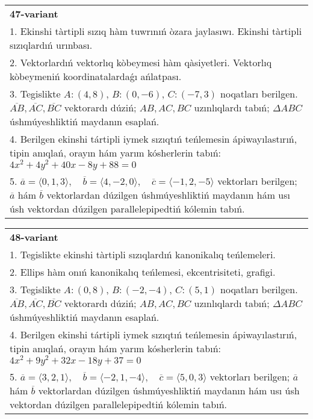 \documentclass{article}
\begin{document}
\begin{tabular}{m{17cm}}
\textbf{47-variant}\\
1. Ekinshi tàrtipli sızıq hàm tuwrınıń òzara jaylasıwı. Ekinshi tàrtipli sızıqlardıń urınbası.\\

2. Vektorlardıń vektorlıq kòbeymesi hàm qàsiyetleri. Vektorlıq kòbeymeniń koordinatalardaǵı ańlatpası. \\

3. Tegislikte $A: (4, 8)$, $B: (0, -6)$, $C: (-7, 3)$ noqatları berilgen. $\overline{AB}, \overline{AC}, \overline{BC}$ vektorardı dúziń; $AB, AC, BC$ uzınlıqlardı tabıń; $\Delta ABC$ úshmúyeshliktiń maydanın esaplań. \\

4. Berilgen ekinshi tártipli iymek sızıqtıń teńlemesin ápiwayılastırıń, tipin anıqlań, orayın hám yarım kósherlerin tabıń: $4x^2+4y^2+40x-8y+88=0$\\

5. \(\overline{a} = \langle 0, 1, 3 \rangle, \quad \overline{b} = \langle 4, -2, 0 \rangle, \quad \overline{c} = \langle -1, 2, -5 \rangle\) vektorları berilgen; \(\overline{a}\) hám \(\overline{b}\) vektorlardan dúzilgen úshmúyeshliktiń maydanın hám usı úsh vektordan dúzilgen parallelepipedtiń kólemin tabıń.
\end{tabular}
\vspace{1cm}


\begin{tabular}{m{17cm}}
\textbf{48-variant}\\
1. Tegislikte ekinshi tàrtipli sızıqlardıń kanonikalıq teńlemeleri.\\

2. Ellips hàm onıń kanonikalıq teńlemesi, ekcentrisiteti, grafigi.\\

3. Tegislikte $A: (0, 8)$, $B: (-2, -4)$, $C: (5, 1)$ noqatları berilgen. $\overline{AB}, \overline{AC}, \overline{BC}$ vektorardı dúziń; $AB, AC, BC$ uzınlıqlardı tabıń; $\Delta ABC$ úshmúyeshliktiń maydanın esaplań. \\

4. Berilgen ekinshi tártipli iymek sızıqtıń teńlemesin ápiwayılastırıń, tipin anıqlań, orayın hám yarım kósherlerin tabıń: $4x^2+9y^2+32x-18y+37=0$\\

5. \(\overline{a} = \langle 3, 2, 1 \rangle, \quad \overline{b} = \langle -2, 1, -4 \rangle, \quad \overline{c} = \langle 5, 0, 3 \rangle\) vektorları berilgen; \(\overline{a}\) hám \(\overline{b}\) vektorlardan dúzilgen úshmúyeshliktiń maydanın hám usı úsh vektordan dúzilgen parallelepipedtiń kólemin tabıń.
\end{tabular}
\vspace{1cm}
\end{document}
